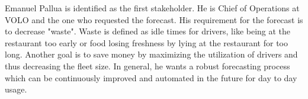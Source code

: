 \begin{table}[h]
\centering
\caption{SIPOC diagram derived from the five basic steps}
\label{tab:sipoc}
\end{table}
Emanuel Pallua is identified as the first stakeholder. He is Chief of Operations at VOLO and the one who requested the forecast. His requirement for the forecast is to decrease "waste". Waste is defined as idle times for drivers, like being at the restaurant too early or food losing freshness by lying at the restaurant for too long. Another goal is to save money by maximizing the utilization of drivers and thus decreasing the fleet size. In general, he wants a robust forecasting process which can be continuously improved and automated in the future for day to day usage. \newline
